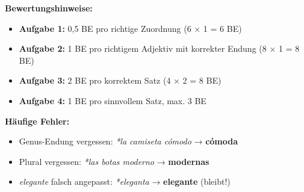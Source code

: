 \documentclass[11pt, a4paper]{article}
\newcommand{\lsg}[1]{\textcolor{loesung}{\textbf{#1}}}
\begin{document}

\vspace{8pt}

\begin{tcolorbox}[colback=hellgrau, colframe=grau, boxrule=0.5pt, arc=0pt,
    left=6pt, right=6pt, top=4pt, bottom=4pt]
\small
\textbf{Bewertungshinweise:}
\begin{itemize}[leftmargin=*, itemsep=2pt]
    \item \textbf{Aufgabe 1:} 0,5 BE pro richtige Zuordnung (6 × 1 = 6 BE)
    \item \textbf{Aufgabe 2:} 1 BE pro richtigem Adjektiv mit korrekter Endung (8 × 1 = 8 BE)
    \item \textbf{Aufgabe 3:} 2 BE pro korrektem Satz (4 × 2 = 8 BE)
    \item \textbf{Aufgabe 4:} 1 BE pro sinnvollem Satz, max. 3 BE
\end{itemize}

\textbf{Häufige Fehler:}
\begin{itemize}[leftmargin=*, itemsep=2pt]
    \item Genus-Endung vergessen: \textit{*la camiseta cómodo} → \lsg{cómoda}
    \item Plural vergessen: \textit{*las botas moderno} → \lsg{modernas}
    \item \textit{elegante} falsch angepasst: \textit{*eleganta} → \lsg{elegante} (bleibt!)
\end{itemize}
\end{tcolorbox}
\end{document}
